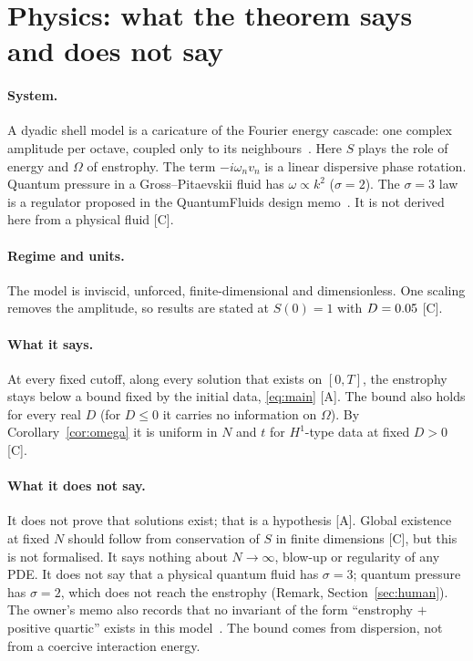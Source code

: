 \documentclass[11pt]{article}
\theoremstyle{remark}
\newcommand{\tier}[1]{\textsf{[#1]}}
\begin{document}
\section{Physics: what the theorem says and does not say}\label{sec:physics}

\paragraph{System.} A dyadic shell model is a caricature of the Fourier energy cascade: one complex amplitude per octave, coupled
only to its neighbours~\cite{waleffe}. Here $S$ plays the role of energy and $\Omega$ of enstrophy. The term
$-i\omega_nv_n$ is a linear dispersive phase rotation. Quantum pressure in a Gross--Pitaevskii fluid has $\omega\propto k^2$
($\sigma=2$). The $\sigma=3$ law is a regulator proposed in the QuantumFluids design memo~\cite{qfrepo}. It is not derived
here from a physical fluid \tier{C}.

\paragraph{Regime and units.} The model is inviscid, unforced, finite-dimensional and dimensionless. One scaling removes
the amplitude, so results are stated at $S(0)=1$ with $D=0.05$ \tier{C}.

\paragraph{What it says.} At every fixed cutoff, along every solution that exists on $[0,T]$, the enstrophy stays below a
bound fixed by the initial data, \eqref{eq:main} \tier{A}. The bound also holds for every real $D$ (for $D\le0$ it carries no
information on $\Omega$). By Corollary~\ref{cor:omega} it is uniform in $N$ and $t$ for $H^1$-type data at fixed $D>0$
\tier{C}.

\paragraph{What it does not say.} It does not prove that solutions exist; that is a hypothesis \tier{A}. Global existence at
fixed $N$ should follow from conservation of $S$ in finite dimensions \tier{C}, but this is not formalised. It says nothing about
$N\to\infty$, blow-up or regularity of any PDE. It does not say that a physical quantum fluid has $\sigma=3$; quantum pressure has
$\sigma=2$, which does not reach the enstrophy (Remark, Section~\ref{sec:human}). The owner's memo also records that
no invariant of the form ``enstrophy $+$ positive quartic'' exists in this model~\cite{qfrepo}. The bound comes from dispersion, not
from a coercive interaction energy.
\end{document}
